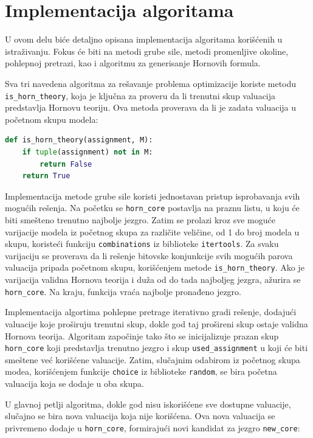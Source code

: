 \documentclass[12pt,oneside]{memoir}
\begin{document}
\section{Implementacija algoritama}
U ovom delu biće detaljno opisana implementacija algoritama korišćenih u istraživanju. Fokus će biti na metodi grube sile, metodi promenljive okoline, pohlepnoj pretrazi, kao i algoritmu za generisanje Hornovih formula.

Sva tri navedena algoritma za rešavanje problema optimizacije koriste metodu \texttt{is\_horn\_theory}, koja je ključna za proveru da li trenutni skup valuacija predstavlja Hornovu teoriju. Ova metoda proverava da li je zadata valuacija u početnom skupu modela:

\begin{lstlisting}[language=Python]
def is_horn_theory(assignment, M):
    if tuple(assignment) not in M:
        return False
    return True
\end{lstlisting}
\vspace{0.5cm}

Implementacija metode grube sile koristi jednostavan pristup isprobavanja svih mogućih rešenja. Na početku se \texttt{horn\_core} postavlja na praznu listu, u koju će biti smešteno trenutno najbolje jezgro. Zatim se prolazi kroz sve moguće varijacije modela iz početnog skupa za različite veličine, od 1 do broj modela u skupu, koristeći funkciju \texttt{combinations} iz biblioteke \texttt{itertools}. Za svaku varijaciju se proverava da li rešenje bitovske konjunkcije svih mogućih parova valuacija pripada početnom skupu, korišćenjem  metode \texttt{is\_horn\_theory}. Ako je varijacija validna Hornova teorija i duža od do tada najboljeg jezgra, ažurira se \texttt{horn\_core}. Na kraju, funkcija vraća najbolje pronađeno jezgro.

Implementacija algortima pohlepne pretrage iterativno gradi rešenje, dodajući valuacije koje proširuju trenutni skup, dokle god taj prošireni skup ostaje validna Hornova teorija. Algoritam započinje tako što se inicijalizuje prazan skup \texttt{horn\_core} koji predstavlja trenutno jezgro i skup \texttt{used\_assignment} u koji će biti smeštene već korišćene valuacije. Zatim, slučajnim odabirom iz početnog skupa modea, korišćenjem funkcije \texttt{choice} iz biblioteke \texttt{random}, se bira početna valuacija koja se dodaje u oba skupa.

U glavnoj petlji algoritma, dokle god nisu iskorišćene sve dostupne valuacije, slučajno se bira nova valuacija koja nije korišćena. Ova nova valuacija se privremeno dodaje u \texttt{horn\_core}, formirajući novi kandidat za jezgro \texttt{new\_core}:
\end{document}
